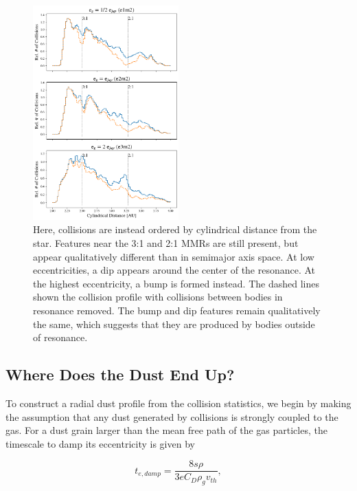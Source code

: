 \documentclass[fleqn,usenatbib]{mnras}
\begin{document}
\begin{figure}
\begin{center}
    \includegraphics[width=0.5\textwidth]{figures/coll_hist_r.png}
    \caption{Here, collisions are instead ordered by cylindrical distance from the star. Features near the 3:1 and 2:1 MMRs are still present, but appear qualitatively different than in semimajor axis space. At low eccentricities, a dip appears around the center of the resonance. At the highest eccentricity, a bump is formed instead. The dashed lines shown the collision profile with collisions between bodies in resonance removed. The bump and dip features remain qualitatively the same, which suggests that they are produced by bodies outside of resonance.\label{fig:coll_hist_r}}
\end{center}
\end{figure}

\subsection{Where Does the Dust End Up?}

To construct a radial dust profile from the collision statistics, we begin by making the assumption that any dust generated by collisions is strongly 
coupled to the gas. For a dust grain larger than the mean free path of the gas particles, the timescale to damp its eccentricity is given by 
\citep{1976PThPh..56.1756A}

\begin{equation}\label{eq:t_edamp}
    t_{e, damp} = \frac{8 s \rho}{3 e C_{D} \rho_{g} v_{th}},
\end{equation}
\end{document}
